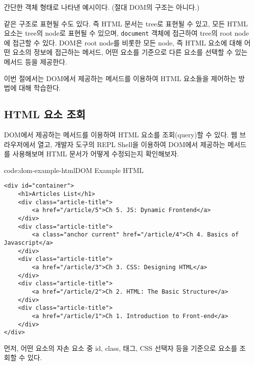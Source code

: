 \는 \을 간단한 객체 형태로 나타낸 예시이다. (절대 DOM의 구조는 아니다.)

    {}

\은 \와 같은 구조로 표현될 수도 있다. 즉 HTML 문서는 tree로 표현될 수 있고, 모든 HTML 요소는 tree의 node로 표현될 수 있으며, \texttt{document} 객체에 접근하여 tree의 root node에 접근할 수 있다. DOM은 root node를 비롯한 모든 node, 즉 HTML 요소에 대해 어떤 요소의 정보에 접근하는 메서드, 어떤 요소를 기준으로 다른 요소를 선택할 수 있는 메서드 등을 제공한다.

이번 절에서는 DOM에서 제공하는 메서드를 이용하여 HTML 요소들을 제어하는 방법에 대해 학습한다.

\subsection*{HTML 요소 조회}

DOM에서 제공하는 메서드를 이용하여 HTML 요소를 조회(query)할 수 있다. \을 웹 브라우저에서 열고, 개발자 도구의 REPL Shell을 이용하여 DOM에서 제공하는 메서드를 사용해보며 HTML 문서가 어떻게 수정되는지 확인해보자.

\begin{codeenv}{code:dom-example-html}{DOM Example HTML}\begin{verbatim}
<div id="container">
    <h1>Articles List</h1>
    <div class="article-title">
        <a href="/article/5">Ch 5. JS: Dynamic Frontend</a>
    </div>
    <div class="article-title">
        <a class="anchor current" href="/article/4">Ch 4. Basics of Javascript</a>
    </div>
    <div class="article-title">
        <a href="/article/3">Ch 3. CSS: Designing HTML</a>
    </div>
    <div class="article-title">
        <a href="/article/2">Ch 2. HTML: The Basic Structure</a>
    </div>
    <div class="article-title">
        <a href="/article/1">Ch 1. Introduction to Front-end</a>
    </div>
</div>
\end{verbatim}
\end{codeenv}

먼저, 어떤 요소의 자손 요소 중 id, class, 태그, CSS 선택자 등을 기준으로 요소를 조회할 수 있다.

